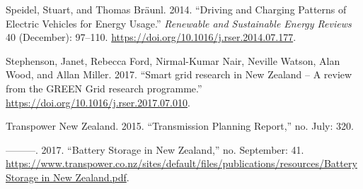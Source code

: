 \documentclass[]{article}
\begin{document}
\leavevmode\hypertarget{ref-speidel_driving_2014}{}%
Speidel, Stuart, and Thomas Bräunl. 2014. ``Driving and Charging Patterns of Electric Vehicles for Energy Usage.'' \emph{Renewable and Sustainable Energy Reviews} 40 (December): 97--110. \url{https://doi.org/10.1016/j.rser.2014.07.177}.

\leavevmode\hypertarget{ref-Stephenson2017}{}%
Stephenson, Janet, Rebecca Ford, Nirmal-Kumar Nair, Neville Watson, Alan Wood, and Allan Miller. 2017. ``Smart grid research in New Zealand -- A review from the GREEN Grid research programme.'' \url{https://doi.org/10.1016/j.rser.2017.07.010}.

\leavevmode\hypertarget{ref-TranspowerNZ2015}{}%
Transpower New Zealand. 2015. ``Transmission Planning Report,'' no. July: 320.

\leavevmode\hypertarget{ref-TranspowerNewZealand2017}{}%
---------. 2017. ``Battery Storage in New Zealand,'' no. September: 41. \href{https://www.transpower.co.nz/sites/default/files/publications/resources/Battery\%20Storage\%20in\%20New\%20Zealand.pdf}{https://www.transpower.co.nz/sites/default/files/publications/resources/Battery Storage in New Zealand.pdf}.
\end{document}
